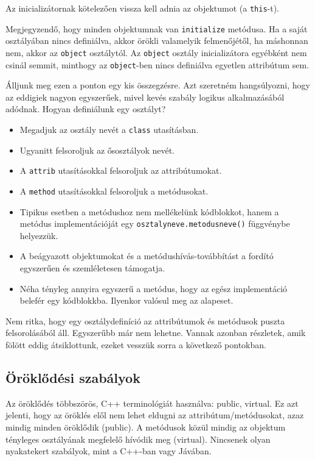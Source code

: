 Az inicializátornak kötelezően vissza kell adnia az objektumot (a \verb!this!-t).

Megjegyzendő, hogy minden objektumnak van \verb!initialize! metódusa.
Ha a saját osztályában nincs definiálva, akkor örökli valamelyik
felmenőjétől, ha máshonnan nem, akkor az \verb!object! osztálytól.
Az \verb!object! osztály inicializátora egyébként nem csinál semmit,
minthogy az \verb!object!-ben nincs definiálva egyetlen attribútum sem.


Álljunk meg ezen a ponton egy kis összegzésre. 
Azt szeretném hangsúlyozni, hogy az eddigiek nagyon egyszerűek,
mivel kevés szabály logikus alkalmazásából adódnak.
Hogyan definiálunk egy osztályt?
\begin{itemize}
\item 
    Megadjuk az osztály nevét a \verb!class! utasításban.
\item 
    Ugyanitt felsoroljuk az ősosztályok nevét.
\item 
    A \verb!attrib! utasításokkal felsoroljuk az attribútumokat.
\item 
    A \verb!method! utasításokkal felsoroljuk a metódusokat.
\item 
    Tipikus esetben a metódushoz nem mellékelünk kódblokkot,
    hanem a metódus implementációját egy \verb!osztalyneve.metodusneve()!
    függvénybe helyezzük.
\item
    A beágyazott objektumokat és a metódushívás-továbbítást
    a fordító egyszerűen és szemléletesen támogatja.
\item
    Néha tényleg annyira egyszerű a metódus, 
    hogy az egész implementáció belefér egy kódblokkba.
    Ilyenkor valósul meg az alapeset.
\end{itemize}
Nem ritka, hogy egy osztálydefiníció
az attribútumok és metódusok  puszta  felsorolásából áll.
Egyszerűbb már nem lehetne. 
Vannak azonban részletek, amik fölött eddig átsiklottunk,
ezeket vesszük sorra a következő pontokban.

\subsection{Öröklődési szabályok}

Az öröklődés többszörös, C++ terminológiát használva: public, virtual.
Ez azt jelenti, hogy az öröklés elől nem lehet eldugni az 
attribútum/metódusokat, azaz mindig minden öröklődik (public).
A metódusok közül mindig az objektum tényleges osztályának megfelelő hívódik 
meg (virtual). Nincsenek olyan nyakatekert szabályok, mint a C++-ban vagy Jávában.

